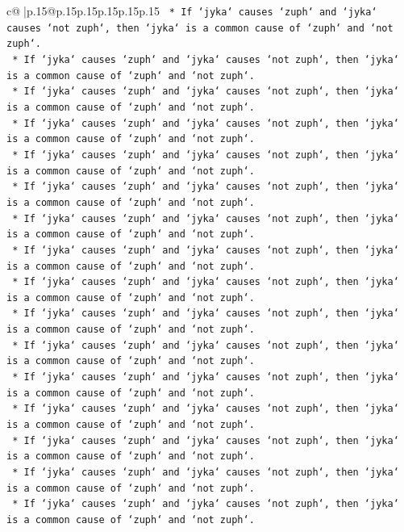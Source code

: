 \documentclass{article}
\begin{document}
{\begin{supertabular}{c@{$\;$}|p{.15\linewidth}@{}p{.15\linewidth}p{.15\linewidth}p{.15\linewidth}p{.15\linewidth}p{.15\linewidth}}
{{{\texttt{    *   If `jyka` causes `zuph` and `jyka` causes `not zuph`, then `jyka` is a common cause of `zuph` and `not zuph`.} \\
\texttt{    *   If `jyka` causes `zuph` and `jyka` causes `not zuph`, then `jyka` is a common cause of `zuph` and `not zuph`.} \\
\texttt{    *   If `jyka` causes `zuph` and `jyka` causes `not zuph`, then `jyka` is a common cause of `zuph` and `not zuph`.} \\
\texttt{    *   If `jyka` causes `zuph` and `jyka` causes `not zuph`, then `jyka` is a common cause of `zuph` and `not zuph`.} \\
\texttt{    *   If `jyka` causes `zuph` and `jyka` causes `not zuph`, then `jyka` is a common cause of `zuph` and `not zuph`.} \\
\texttt{    *   If `jyka` causes `zuph` and `jyka` causes `not zuph`, then `jyka` is a common cause of `zuph` and `not zuph`.} \\
\texttt{    *   If `jyka` causes `zuph` and `jyka` causes `not zuph`, then `jyka` is a common cause of `zuph` and `not zuph`.} \\
\texttt{    *   If `jyka` causes `zuph` and `jyka` causes `not zuph`, then `jyka` is a common cause of `zuph` and `not zuph`.} \\
\texttt{    *   If `jyka` causes `zuph` and `jyka` causes `not zuph`, then `jyka` is a common cause of `zuph` and `not zuph`.} \\
\texttt{    *   If `jyka` causes `zuph` and `jyka` causes `not zuph`, then `jyka` is a common cause of `zuph` and `not zuph`.} \\
\texttt{    *   If `jyka` causes `zuph` and `jyka` causes `not zuph`, then `jyka` is a common cause of `zuph` and `not zuph`.} \\
\texttt{    *   If `jyka` causes `zuph` and `jyka` causes `not zuph`, then `jyka` is a common cause of `zuph` and `not zuph`.} \\
\texttt{    *   If `jyka` causes `zuph` and `jyka` causes `not zuph`, then `jyka` is a common cause of `zuph` and `not zuph`.} \\
\texttt{    *   If `jyka` causes `zuph` and `jyka` causes `not zuph`, then `jyka` is a common cause of `zuph` and `not zuph`.} \\
\texttt{    *   If `jyka` causes `zuph` and `jyka` causes `not zuph`, then `jyka` is a common cause of `zuph` and `not zuph`.} \\
\texttt{    *   If `jyka` causes `zuph` and `jyka` causes `not zuph`, then `jyka` is a common cause of `zuph` and `not zuph`.} \\
}}}
\end{supertabular}}
\end{document}
